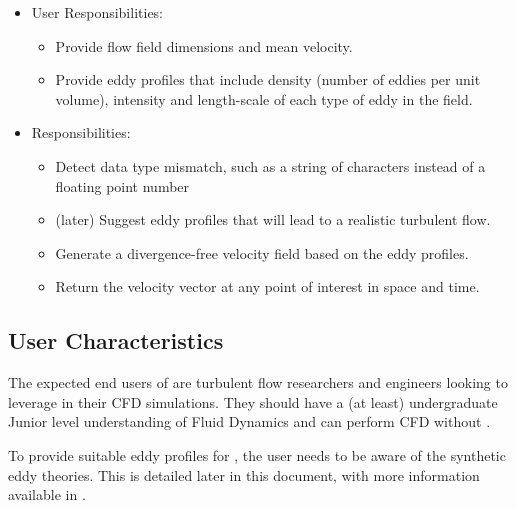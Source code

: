 \documentclass[12pt]{article}
\begin{document}
\begin{itemize}
\item User Responsibilities:
\begin{itemize}
\item Provide flow field dimensions and mean velocity.
\item Provide eddy profiles that include density (number of eddies per unit volume), intensity and length-scale of each type of eddy in the field.
\end{itemize}
\item \progname{} Responsibilities:
\begin{itemize}
\item Detect data type mismatch, such as a string of characters instead of a
  floating point number
\item (later) Suggest eddy profiles that will lead to a realistic turbulent flow.
\item Generate a divergence-free velocity field based on the eddy profiles.
\item Return the velocity vector at any point of interest in space and time.
\end{itemize}
\end{itemize}


\subsection{User Characteristics} \label{SecUserCharacteristics}

The expected end users of \progname{} are turbulent flow researchers and engineers looking to leverage \progname{} in their CFD simulations. They should have a (at least) undergraduate Junior level understanding of Fluid Dynamics and can perform CFD without \progname{}.

To provide suitable eddy profiles for \progname{}, the user needs to be aware of the synthetic eddy theories. This is detailed later in this document, with more information available in \citet{PolettoEtAl2013}.
\end{document}
